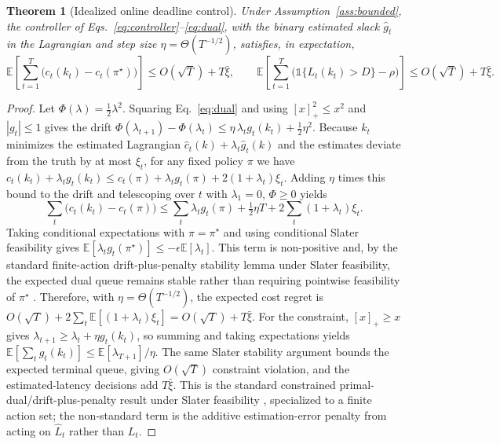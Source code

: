\documentclass[11pt]{article}
\newtheorem{theorem}{Theorem}
\begin{document}
\begin{theorem}[Idealized online deadline control]
\label{thm:online}
Under Assumption~\ref{ass:bounded}, the controller of
Eqs.~\eqref{eq:controller}--\eqref{eq:dual}, with the binary estimated slack
$\widehat{g}_t$ in the Lagrangian and step size $\eta=\Theta(T^{-1/2})$,
satisfies, in expectation,
\begin{equation}
    \mathbb{E}\!\left[\sum_{t=1}^{T}\!\big(c_t(k_t)-c_t(\pi^{\star})\big)\right]\le O(\sqrt{T})+T\bar\xi,
    \qquad
    \mathbb{E}\!\left[\sum_{t=1}^{T}\!\big(\mathbb{1}\{L_t(k_t)>D\}-\rho\big)\right]\le O(\sqrt{T})+T\bar\xi.
\end{equation}
\end{theorem}
\begin{proof}
Let $\Phi(\lambda)=\tfrac12\lambda^2$. Squaring Eq.~\eqref{eq:dual} and using
$[x]_+^2\le x^2$ and $|g_t|\le1$ gives the drift
$\Phi(\lambda_{t+1})-\Phi(\lambda_t)\le \eta\,\lambda_t g_t(k_t)+\tfrac12\eta^2$.
Because $k_t$ minimizes the estimated Lagrangian $\widehat c_t(k)+\lambda_t\widehat g_t(k)$
and the estimates deviate from the truth by at most $\xi_t$, for any fixed policy
$\pi$ we have
$c_t(k_t)+\lambda_t g_t(k_t)\le c_t(\pi)+\lambda_t g_t(\pi)+2(1+\lambda_t)\xi_t$.
Adding $\eta$ times this bound to the drift and telescoping over $t$ with
$\lambda_1=0$, $\Phi\ge0$ yields
\[
\sum_{t}\big(c_t(k_t)-c_t(\pi)\big)\le
\sum_t \lambda_t g_t(\pi) + \tfrac12\eta T + 2\sum_t(1+\lambda_t)\xi_t .
\]
Taking conditional expectations with $\pi=\pi^{\star}$ and using conditional
Slater feasibility gives
$\mathbb{E}[\lambda_t g_t(\pi^{\star})]\le-\epsilon\mathbb{E}[\lambda_t]$.
This term is non-positive and, by the standard finite-action
drift-plus-penalty stability lemma under Slater feasibility, the expected dual
queue remains stable rather than requiring pointwise feasibility of
$\pi^{\star}$ \citep{yu2017online}. Therefore, with
$\eta=\Theta(T^{-1/2})$, the expected cost regret is
$O(\sqrt T)+2\sum_t\mathbb{E}[(1+\lambda_t)\xi_t]=O(\sqrt T)+T\bar\xi$.
For the constraint, $[x]_+\ge x$ gives $\lambda_{t+1}\ge\lambda_t+\eta g_t(k_t)$,
so summing and taking expectations yields
$\mathbb{E}[\sum_t g_t(k_t)]\le\mathbb{E}[\lambda_{T+1}]/\eta$. The same Slater
stability argument bounds the expected terminal queue, giving
$O(\sqrt T)$ constraint violation, and the estimated-latency decisions add
$T\bar\xi$. This is the standard constrained primal-dual/drift-plus-penalty
result under Slater feasibility \citep{yu2017online}, specialized to a finite
action set; the non-standard term is the additive estimation-error penalty from
acting on $\widehat{L}_t$ rather than $L_t$.
\end{proof}
\end{document}
